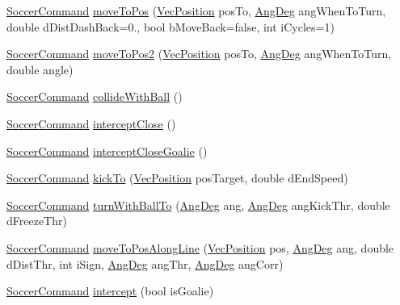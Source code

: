 \begin{DoxyCompactItemize}
\item 
\hyperlink{classSoccerCommand}{Soccer\+Command} \hyperlink{classBasicPlayer_a0310219cd313d63785a72d482db2348b}{move\+To\+Pos} (\hyperlink{classVecPosition}{Vec\+Position} pos\+To, \hyperlink{Geometry_8h_a6bfe02ae9bb185092902092561ab2865}{Ang\+Deg} ang\+When\+To\+Turn, double d\+Dist\+Dash\+Back=0., bool b\+Move\+Back=false, int i\+Cycles=1)
\item 
\hyperlink{classSoccerCommand}{Soccer\+Command} \hyperlink{classBasicPlayer_a69ab617e6e772c686efec2d94d780723}{move\+To\+Pos2} (\hyperlink{classVecPosition}{Vec\+Position} pos\+To, \hyperlink{Geometry_8h_a6bfe02ae9bb185092902092561ab2865}{Ang\+Deg} ang\+When\+To\+Turn, double angle)
\item 
\hyperlink{classSoccerCommand}{Soccer\+Command} \hyperlink{classBasicPlayer_aac84d06304774170af7b01162558da3e}{collide\+With\+Ball} ()
\item 
\hyperlink{classSoccerCommand}{Soccer\+Command} \hyperlink{classBasicPlayer_abcee3b0e4dadf0305022280beaf5991e}{intercept\+Close} ()
\item 
\hyperlink{classSoccerCommand}{Soccer\+Command} \hyperlink{classBasicPlayer_a93a7e41c8b11d8fe6b92f950141a6ec3}{intercept\+Close\+Goalie} ()
\item 
\hyperlink{classSoccerCommand}{Soccer\+Command} \hyperlink{classBasicPlayer_a502eaf4aa2a5ba85af56f6863e767395}{kick\+To} (\hyperlink{classVecPosition}{Vec\+Position} pos\+Target, double d\+End\+Speed)
\item 
\hyperlink{classSoccerCommand}{Soccer\+Command} \hyperlink{classBasicPlayer_a6b8241babfa3f51132484b2ff73af042}{turn\+With\+Ball\+To} (\hyperlink{Geometry_8h_a6bfe02ae9bb185092902092561ab2865}{Ang\+Deg} ang, \hyperlink{Geometry_8h_a6bfe02ae9bb185092902092561ab2865}{Ang\+Deg} ang\+Kick\+Thr, double d\+Freeze\+Thr)
\item 
\hyperlink{classSoccerCommand}{Soccer\+Command} \hyperlink{classBasicPlayer_a05e0fa368dc255e0d36c5d4b72d23899}{move\+To\+Pos\+Along\+Line} (\hyperlink{classVecPosition}{Vec\+Position} pos, \hyperlink{Geometry_8h_a6bfe02ae9bb185092902092561ab2865}{Ang\+Deg} ang, double d\+Dist\+Thr, int i\+Sign, \hyperlink{Geometry_8h_a6bfe02ae9bb185092902092561ab2865}{Ang\+Deg} ang\+Thr, \hyperlink{Geometry_8h_a6bfe02ae9bb185092902092561ab2865}{Ang\+Deg} ang\+Corr)
\item 
\hyperlink{classSoccerCommand}{Soccer\+Command} \hyperlink{classBasicPlayer_af6b9642a2abd6f5f3fc359589d1373d6}{intercept} (bool is\+Goalie)
\item 

\end{DoxyCompactItemize}
